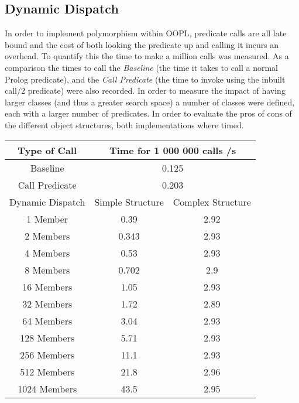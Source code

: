 \documentclass[12pt,a4paper,twoside,openright]{report}
\begin{document}
\subsection{Dynamic Dispatch}

In order to implement polymorphism within OOPL, predicate calls are all late bound and the cost of both looking the predicate up and calling it incurs an overhead. To quantify this the time to make a million calls was measured. As a comparison the times to call the \emph{Baseline} (the time it takes to call a normal Prolog predicate), and the \emph{Call Predicate} (the time to invoke using the inbuilt call/2 predicate) were also recorded. In order to measure the impact of having larger classes (and thus a greater search space) a number of classes were defined, each with a larger number of predicates. In order to evaluate the pros of cons of the different object structures, both implementations where timed.

\begin{center}
\begin{tabular}{c|c|c}
Type of Call & \multicolumn{2}{c}{Time for 1 000 000 calls /s} \\
\hline
Baseline&\multicolumn{2}{c}{0.125}\\
Call Predicate&\multicolumn{2}{c}{0.203}\\
\hline
Dynamic Dispatch& Simple Structure & Complex Structure \\
\hline		
1 Member	&	0.39	&	2.92	\\
2 Members	&	0.343	&	2.93	\\
4 Members	&	0.53	&	2.93	\\
8 Members	&	0.702	&	2.9	\\
16 Members	&	1.05	&	2.93	\\
32 Members	&	1.72	&	2.89	\\
64 Members	&	3.04	&	2.93	\\
128 Members	&	5.71	&	2.93	\\
256 Members	&	11.1	&	2.93	\\
512 Members	&	21.8	&	2.96	\\
1024 Members	&	43.5	&	2.95	\\


\end{tabular}
\end{center}
\end{document}
